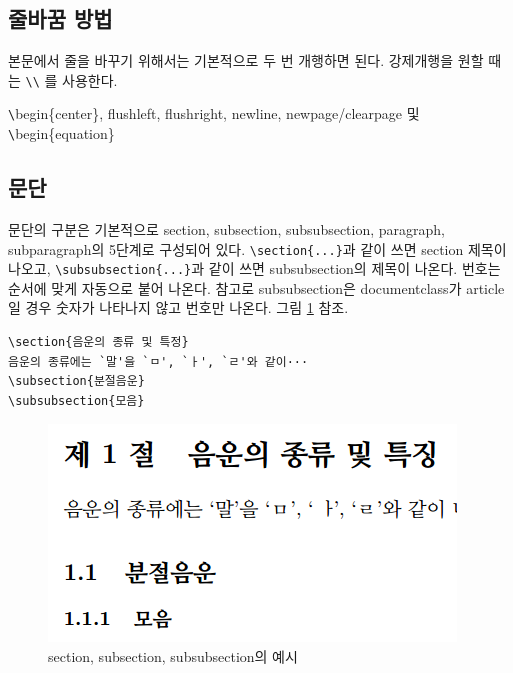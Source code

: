 \documentclass[11pt]{article}
\begin{document}
\subsection{줄바꿈 방법}

본문에서 줄을 바꾸기 위해서는 기본적으로 두 번 개행하면 된다. 강제개행을 원할 
때는 \verb|\\| 를 사용한다.

\verb+\+begin\{center\}, flushleft, flushright, newline, newpage/clearpage 및 \verb+\+begin\{equation\}

\subsection{문단}
문단의 구분은 기본적으로 section, subsection, subsubsection, paragraph, 
subparagraph의 5단계로 구성되어 있다. \verb|\section{...}|과 같이 쓰면 section 
제목이 나오고, \verb|\subsubsection{...}|과 같이 쓰면 subsubsection의 제목이 
나온다. 번호는 순서에 맞게 자동으로 붙어 나온다. 참고로 subsubsection은 
documentclass가 article일 경우 숫자가 나타나지 않고 번호만 나온다. 그림 
\ref{section} 참조.

\begin{verbatim}
\section{음운의 종류 및 특정}
음운의 종류에는 `말'을 `ㅁ', `ㅏ', `ㄹ'와 같이···
\subsection{분절음운}
\subsubsection{모음}
\end{verbatim}

\begin{figure}[h]
	\begin{center}
		\includegraphics{section_subsection_subsubsection.png}
	\end{center}
	\caption{section, subsection, subsubsection의 예시}
	\label{section}
\end{figure}
\end{document}
